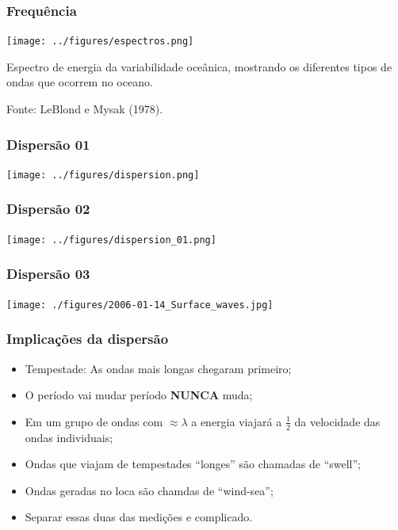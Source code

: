 \begin{frame}
\frametitle{Frequência}
  \begin{center}
    \texttt{[image: ../figures/espectros.png]}
  \end{center}

  {\tiny Espectro de energia da variabilidade oceânica, mostrando os diferentes
         tipos de ondas que ocorrem no oceano.}

  {\tiny Fonte: LeBlond e Mysak (1978).}
\end{frame}



\begin{frame}
\frametitle{Dispersão 01}
\begin{center}
  \texttt{[image: ../figures/dispersion.png]}
\end{center}
\end{frame}


\begin{frame}
\frametitle{Dispersão 02}
\begin{center}
  \texttt{[image: ../figures/dispersion\_01.png]}
\end{center}
\end{frame}


\begin{frame}
\frametitle{Dispersão 03}
\begin{center}
  \texttt{[image: ./figures/2006-01-14\_Surface\_waves.jpg]}
\end{center}
\end{frame}


\begin{frame}
\frametitle{Implicações da dispersão}
  {\small
  \begin{itemize}[<+-| alert@+>]
    \item Tempestade: As ondas mais longas chegaram primeiro;
    \item O período vai mudar período {\bf NUNCA} muda;
    \item Em um grupo de ondas com $\approx \lambda$ a energia viajará a
          $\frac{1}{2}$ da velocidade das ondas individuais;
    \item Ondas que viajam de tempestades ``longes'' são chamadas de ``swell'';
    \item Ondas geradas no loca são chamdas de ``wind-sea'';
    \item Separar essas duas das medições e complicado.
  \end{itemize}
  }
\end{frame}


